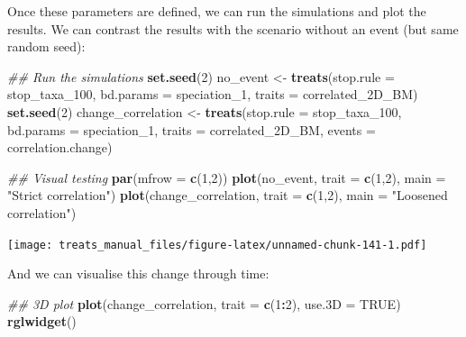 \documentclass[
]{book}
\newenvironment{Shaded}{\begin{snugshade}}{\end{snugshade}}
\newcommand{\CommentTok}[1]{\textcolor[rgb]{0.56,0.35,0.01}{\textit{#1}}}
\newcommand{\DataTypeTok}[1]{\textcolor[rgb]{0.13,0.29,0.53}{#1}}
\newcommand{\DecValTok}[1]{\textcolor[rgb]{0.00,0.00,0.81}{#1}}
\newcommand{\KeywordTok}[1]{\textcolor[rgb]{0.13,0.29,0.53}{\textbf{#1}}}
\newcommand{\NormalTok}[1]{#1}
\newcommand{\OperatorTok}[1]{\textcolor[rgb]{0.81,0.36,0.00}{\textbf{#1}}}
\newcommand{\OtherTok}[1]{\textcolor[rgb]{0.56,0.35,0.01}{#1}}
\newcommand{\StringTok}[1]{\textcolor[rgb]{0.31,0.60,0.02}{#1}}
\begin{document}
Once these parameters are defined, we can run the simulations and plot the results.
We can contrast the results with the scenario without an event (but same random seed):

\begin{Shaded}
\begin{Highlighting}[]
\CommentTok{\#\# Run the simulations}
\KeywordTok{set.seed}\NormalTok{(}\DecValTok{2}\NormalTok{)}
\NormalTok{no\_event \textless{}{-}}\StringTok{ }\KeywordTok{treats}\NormalTok{(}\DataTypeTok{stop.rule =}\NormalTok{ stop\_taxa\_}\DecValTok{100}\NormalTok{,}
                 \DataTypeTok{bd.params =}\NormalTok{ speciation\_}\DecValTok{1}\NormalTok{,}
                 \DataTypeTok{traits    =}\NormalTok{ correlated\_2D\_BM)}
\KeywordTok{set.seed}\NormalTok{(}\DecValTok{2}\NormalTok{)}
\NormalTok{change\_correlation \textless{}{-}}\StringTok{ }\KeywordTok{treats}\NormalTok{(}\DataTypeTok{stop.rule =}\NormalTok{ stop\_taxa\_}\DecValTok{100}\NormalTok{,}
                           \DataTypeTok{bd.params =}\NormalTok{ speciation\_}\DecValTok{1}\NormalTok{,}
                           \DataTypeTok{traits    =}\NormalTok{ correlated\_2D\_BM,}
                           \DataTypeTok{events    =}\NormalTok{ correlation.change)}

\CommentTok{\#\# Visual testing}
\KeywordTok{par}\NormalTok{(}\DataTypeTok{mfrow =} \KeywordTok{c}\NormalTok{(}\DecValTok{1}\NormalTok{,}\DecValTok{2}\NormalTok{))}
\KeywordTok{plot}\NormalTok{(no\_event, }\DataTypeTok{trait =} \KeywordTok{c}\NormalTok{(}\DecValTok{1}\NormalTok{,}\DecValTok{2}\NormalTok{), }\DataTypeTok{main =} \StringTok{"Strict correlation"}\NormalTok{)}
\KeywordTok{plot}\NormalTok{(change\_correlation, }\DataTypeTok{trait =} \KeywordTok{c}\NormalTok{(}\DecValTok{1}\NormalTok{,}\DecValTok{2}\NormalTok{), }\DataTypeTok{main =} \StringTok{"Loosened correlation"}\NormalTok{)}
\end{Highlighting}
\end{Shaded}

\texttt{[image: treats\_manual\_files/figure-latex/unnamed-chunk-141-1.pdf]}

And we can visualise this change through time:

\begin{Shaded}
\begin{Highlighting}[]
\CommentTok{\#\# 3D plot}
\KeywordTok{plot}\NormalTok{(change\_correlation, }\DataTypeTok{trait =} \KeywordTok{c}\NormalTok{(}\DecValTok{1}\OperatorTok{:}\DecValTok{2}\NormalTok{), }\DataTypeTok{use.3D =} \OtherTok{TRUE}\NormalTok{)}
\KeywordTok{rglwidget}\NormalTok{()}
\end{Highlighting}
\end{Shaded}
\end{document}
